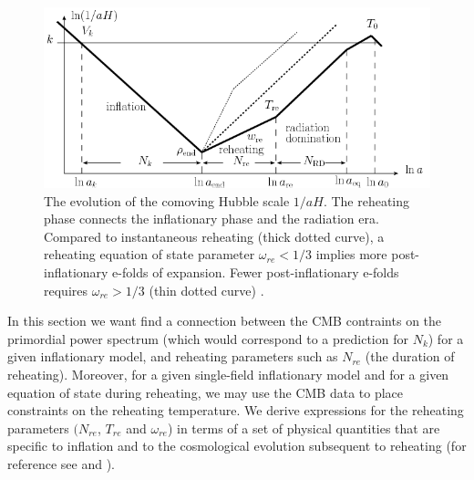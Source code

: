 \documentclass[11pt,a4paper,twoside]{book}
\begin{document}
\begin{figure}
	\centering
	\includegraphics[width=0.8\linewidth, height=0.3\textheight]{Images/Chap3/Dai_Kamionkowsi_Fig1}
	\caption{The evolution of the comoving Hubble scale $ 1/aH $. The reheating phase connects the inflationary phase and the radiation era. Compared to instantaneous reheating (thick dotted curve), a reheating equation of state parameter $ \omega_{re}<1/3 $ implies more post-inflationary e-folds of expansion. Fewer post-inflationary e-folds requires $ \omega_{re} > 1/3 $ (thin dotted curve) \cite{Chap3:Kai_Kamionkowsy}.}
	\label{fig:daikamionkowsifig1}
\end{figure}
In this section we want find a connection between the CMB contraints on the primordial power spectrum (which would correspond to a prediction for $ N_{k} $) for a given inflationary model, and reheating parameters such as $ N_{re} $ (the duration of reheating). Moreover, for a given single-field inflationary model and for a given equation of state during reheating, we may use the CMB data to place constraints on the reheating temperature. We derive expressions for the reheating parameters $ (N_{re}$, $T_{re}$ and $ \omega_{re} $) in terms of a set of physical quantities that are specific to inflation and to the cosmological evolution subsequent to reheating (for reference see \cite{Chap3:Cook} and \cite{Chap3:Kai_Kamionkowsy}).
\end{document}
